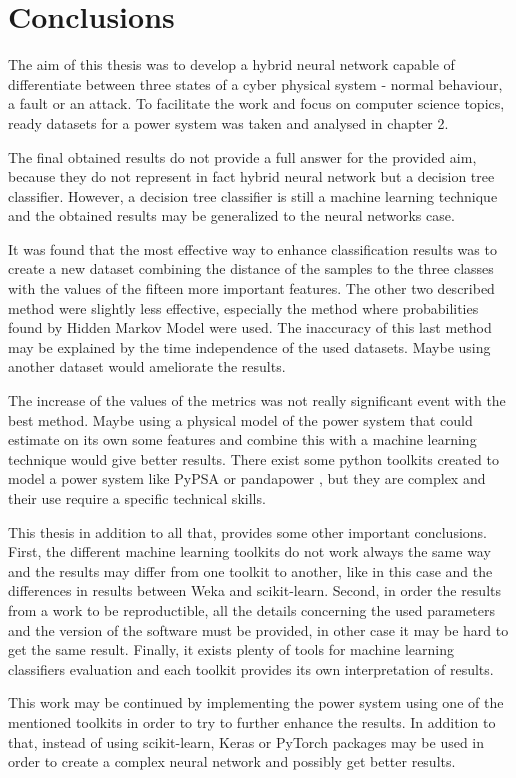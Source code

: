 \chapter{Conclusions}

The aim of this thesis was to develop a hybrid neural network capable of differentiate between three states of a cyber physical system - normal behaviour, a fault or an attack. To facilitate the work and focus on computer science topics, ready datasets for a power system was taken and analysed in chapter 2. 

The final obtained results do not provide a full answer for the provided aim, because they do not represent in fact hybrid neural network but a decision tree classifier. However, a decision tree classifier is still a machine learning technique and the obtained results may be generalized to the neural networks case.

It was found that the most effective way to enhance classification results was to create a new dataset combining the distance of the samples to the three classes with the values of the fifteen more important features. The other two described method were slightly less effective, especially the method where probabilities found by Hidden Markov Model were used. The inaccuracy of this last method may be explained by the time independence of the used datasets. Maybe using another dataset would ameliorate the results.

The increase of the values of the metrics was not really significant event with the best method. Maybe using a physical model of the power system that could estimate on its own some features and combine this with a machine learning technique would give better results. There exist some python toolkits created to model a power system like PyPSA \cite{brown_pypsapypsa_2020} or pandapower \cite{noauthor_pandapower_nodate}, but they are complex and their use require a specific technical skills.

This thesis in addition to all that, provides some other important conclusions. First, the different machine learning toolkits do not work always the same way and the results may differ from one toolkit to another, like in this case and the differences in results between Weka and scikit-learn. Second, in order the results from a work to be reproductible, all the details concerning the used parameters and the version of the software must be provided, in other case it may be hard to get the same result. Finally, it exists plenty of tools for machine learning classifiers evaluation and each toolkit provides its own interpretation of results.

This work may be continued by implementing the power system using one of the mentioned toolkits in order to try to further enhance the results. In addition to that, instead of using scikit-learn, Keras \cite{noauthor_keras_nodate} or PyTorch \cite{noauthor_pytorch_nodate} packages may be used in order to create a complex neural network and possibly get better results.   